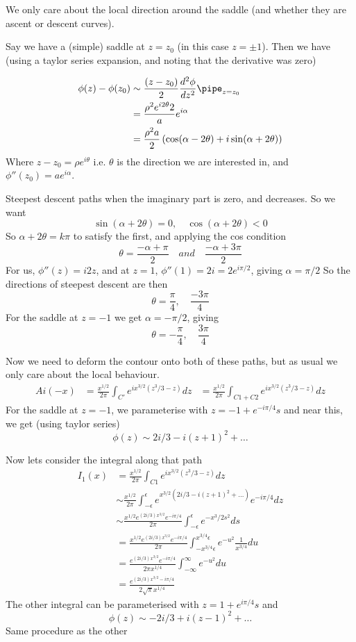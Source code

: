 \documentclass{X:/Documents/Coding/Latex/myassignment}
\begin{document}
We only care about the local direction around the saddle (and whether they are ascent or descent curves).

Say we have a (simple) saddle at $z = z_0$ (in this case $z=\pm 1$). Then we have (using a taylor series expansion, and noting that the derivative was zero)

\begin{align*}
    \phi(z) - \phi(z_0) &\sim \frac{(z-z_0)}{2} \frac{d^2\phi}{dz^2} \pipe_{z=z_0}\\
     &= \frac{\rho^2 e^{i2\theta}{2}} ae^{i \alpha}    \\
     &= \frac{\rho^2 a}{2} \left(\cos(\alpha-2 \theta) + i \sin(\alpha + 2\theta)\right)
\end{align*}
Where $z-z_0 = \rho e^{i\theta}$ i.e. $\theta$ is the direction we are interested in, and $\phi''(z_0) = ae^{i \alpha}$.

Steepest descent paths when the imaginary part is zero, and decreases. So we want
\[\sin(\alpha + 2 \theta) = 0, \quad \cos(\alpha + 2\theta)< 0\]
So $\alpha + 2\theta = k\pi$ to satisfy the first, and applying the cos condition
\[\theta  = \frac{-\alpha + \pi}{2} \quad and \quad \frac{-\alpha + 3\pi}{2} \]
For us, $\phi''(z) = i2z$, and at $z=1$, $\phi''(1) = 2i = 2e^{i\pi/2}$, giving $\alpha = \pi/2$
So the directions of steepest descent are then
\[\theta = \frac{\pi}{4} , \quad \frac{-3\pi}{4}\]
For the saddle at $z=-1$ we get $\alpha = -\pi/2$, giving
\[\theta = -\frac{\pi}{4}, \quad \frac{3\pi}{4}\]

Now we need to deform the contour onto both of these paths, but as usual we only care about the local behaviour.
\begin{align*}
    Ai(-x) &=  \frac{x^{1/2}}{2\pi} \int_{C'} e^{ix^{3/2}(z^3/3-z)} dz
    &=\frac{x^{1/2}}{2\pi}\int_{C1 + C2} e^{ix^{3/2}(z^3/3-z)} dz
\end{align*}
For the saddle at $z=-1$, we parameterise with $z = -1 + e^{-i\pi/4}s$ and near this, we get (using taylor series)
\[\phi(z) \sim 2i/3 - i(z+1)^2 + \ldots\]

Now lets consider the integral along that path
\begin{align*}
    I_1(x) &= \frac{x^{1/2}}{2\pi}\int_{C1} e^{ix^{3/2}(z^3/3-z)} dz\\
    &\sim \frac{x^{1/2}}{2\pi}\int_{-\epsilon}^\epsilon e^{x^{3/2}(2i/3 - i(z+1)^2 + \ldots)}e^{-i\pi/4} dz\\
    &\sim \frac{x^{1/2}e^{(2i/3)x^{3/2}} e^{-i\pi/4}}{2\pi} \int_{-\epsilon}^\epsilon e^{-x^3/2 s^2} ds \\
    & = \frac{x^{1/2}e^{(2i/3)x^{3/2}} e^{-i\pi/4}}{2\pi} \int_{-x^{3/4}\epsilon}^{x^{3/4}\epsilon} e^{-u^2} \frac{1}{x^{3/4}}du \\
    & = \frac{e^{(2i/3)x^{3/2}} e^{-i\pi/4}}{2\pi x^{1/4}} \int_{-\infty}^{\infty} e^{-u^2} du \\
    & = \frac{e^{(2i/3)x^{3/2}-i\pi/4}}{2\sqrt{\pi} x^{1/4}} 
\end{align*}
The other integral can be parameterised with $z = 1 + e^{i\pi/4}s$ and 
\[\phi(z) \sim -2i/3 + i(z-1)^2 + \ldots\]
Same procedure as the other
\end{document}
